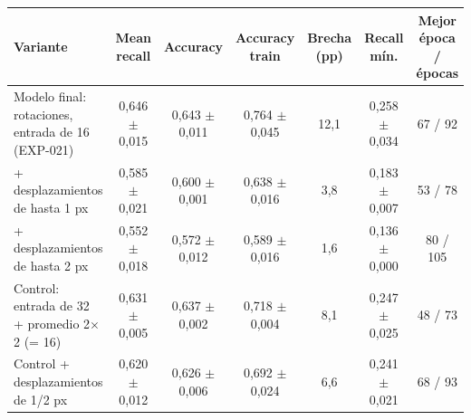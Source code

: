 \begin{tabular}{lcccccc}
\toprule
Variante & Mean recall & Accuracy & Accuracy train & Brecha (pp) & Recall mín. & Mejor época / épocas \\
\midrule
Modelo final: rotaciones, entrada de 16 (EXP-021) & 0,646 $\pm$ 0,015 & 0,643 $\pm$ 0,011 & 0,764 $\pm$ 0,045 & 12,1 & 0,258 $\pm$ 0,034 & 67 / 92 \\
+ desplazamientos de hasta 1 px & 0,585 $\pm$ 0,021 & 0,600 $\pm$ 0,001 & 0,638 $\pm$ 0,016 & 3,8 & 0,183 $\pm$ 0,007 & 53 / 78 \\
+ desplazamientos de hasta 2 px & 0,552 $\pm$ 0,018 & 0,572 $\pm$ 0,012 & 0,589 $\pm$ 0,016 & 1,6 & 0,136 $\pm$ 0,000 & 80 / 105 \\
Control: entrada de 32 + promedio 2$\times$2 (= 16) & 0,631 $\pm$ 0,005 & 0,637 $\pm$ 0,002 & 0,718 $\pm$ 0,004 & 8,1 & 0,247 $\pm$ 0,025 & 48 / 73 \\
Control + desplazamientos de 1/2 px & 0,620 $\pm$ 0,012 & 0,626 $\pm$ 0,006 & 0,692 $\pm$ 0,024 & 6,6 & 0,241 $\pm$ 0,021 & 68 / 93 \\
\bottomrule
\end{tabular}
